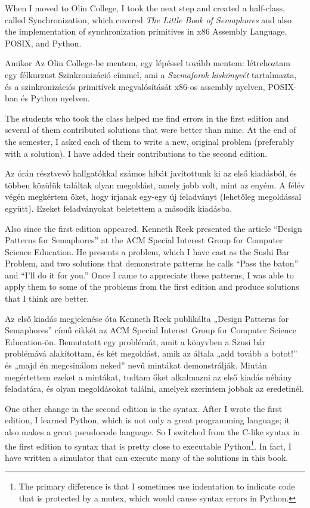 \documentclass{book}
\begin{document}
When I moved to Olin College, I took the next step and created a
half-class, called Synchronization, which covered
{\em The Little Book of Semaphores} and also the implementation of
synchronization primitives in x86 Assembly Language, POSIX, and
Python.

Amikor Az Olin College-be mentem, egy lépéssel tovább mentem:
létrehoztam egy félkurzust Szinkronizáció címmel, ami a
{\em Szemaforok kiskönyvét} tartalmazta, és a szinkronizációs
primitívek megvalósítását x86-os assembly nyelven, POSIX-ban
és Python nyelven.

The students who took the class
helped me find errors in the first edition and several
of them contributed solutions that were better than mine.  At the
end of the semester, I asked each of them to write a new,
original problem (preferably with a solution).  I have added their
contributions to the second edition.

Az órán résztvevő hallgatókkal számos hibát javítottunk ki
az első kiadásból, és többen közülük találtak olyan megoldást,
amely jobb volt, mint az enyém. A félév végén megkértem őket,
hogy írjanak egy-egy új feladványt (lehetőleg megoldással együtt).
Ezeket feladványokat beletettem a második kiadásba.

Also since the first edition appeared, Kenneth Reek presented the
article ``Design Patterns for Semaphores'' at the ACM Special Interest
Group for Computer Science Education.  He presents a problem, which
I have cast as the Sushi Bar Problem, and two solutions that demonstrate
patterns he calls ``Pass the baton'' and ``I'll do it for you.''
Once I came to appreciate these patterns, I was able to apply them
to some of the problems from the first edition and produce solutions
that I think are better.

Az első kiadás megjelenése óta Kenneth Reek publikálta „Design Patterns for Semaphores”
című cikkét az ACM Special Interest Group for Computer Science Education-ön.
Bemutatott egy problémát, amit a könyvben a Szusi bár problémává
alakítottam, és két megoldást, amik az általa „add tovább a botot!”
és „majd én megcsinálom neked” nevű mintákat demonstrálják.
Miután megértettem ezeket a mintákat, tudtam őket alkalmazni
az első kiadás néhány feladatára, és olyan megoldásokat találni,
amelyek szerintem jobbak az eredetinél.

One other change in the second edition is the syntax.  After I wrote
the first edition, I learned Python, which is not only a great
programming language; it also makes a great pseudocode language.  So I
switched from the C-like syntax in the first edition to syntax
that is pretty close to executable Python\footnote{The primary
difference is that I sometimes use indentation to indicate code that
is protected by a mutex, which would cause syntax errors in Python.}.
In fact, I have written a simulator that can execute many of the
solutions in this book.
\end{document}
